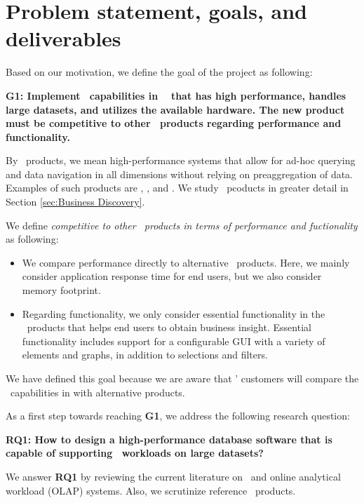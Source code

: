 \section{Problem statement, goals, and deliverables}
\label{sec:problem-statement-and-goals}
Based on our motivation, we define the goal of the project as following: 

\textbf{G1: Implement \bd~capabilities in \genusSoftware~ that has high performance, handles large datasets, and utilizes the available hardware. The new product must be competitive to other \bd~products regarding performance and functionality.}

By \bd~products, we mean high-performance systems that allow for ad-hoc querying and data navigation in all dimensions without relying on preaggregation of data. Examples of such products are \qlikview, \tableau, and \powerpivot. We study \bd~pcoducts in greater detail in Section \ref{sec:Business Discovery}.

We define \textit{competitive to other \bd~products in terms of performance and fuctionality} as following:
\begin{itemize}
  \item We compare performance directly to alternative \bd~products. Here, we mainly consider application response time for end users, but we also consider memory footprint.
  \item Regarding functionality, we only consider essential functionality in the \bd~products that helps end users to obtain business insight. Essential functionality includes support for a configurable GUI with a variety of elements and graphs, in addition to selections and filters.
\end{itemize}

We have defined this goal because we are aware that \genus' customers will compare the \bd~capabilities in \genusSoftware with alternative products. 

As a first step towards reaching \textbf{G1}, we address the following research question:

\textbf{RQ1: How to design a high-performance database software that is capable of supporting \bd~workloads on large datasets?} 

We answer \textbf{RQ1} by reviewing the current literature on \bi~and online analytical workload (OLAP) systems. Also, we scrutinize reference \bd~products.
